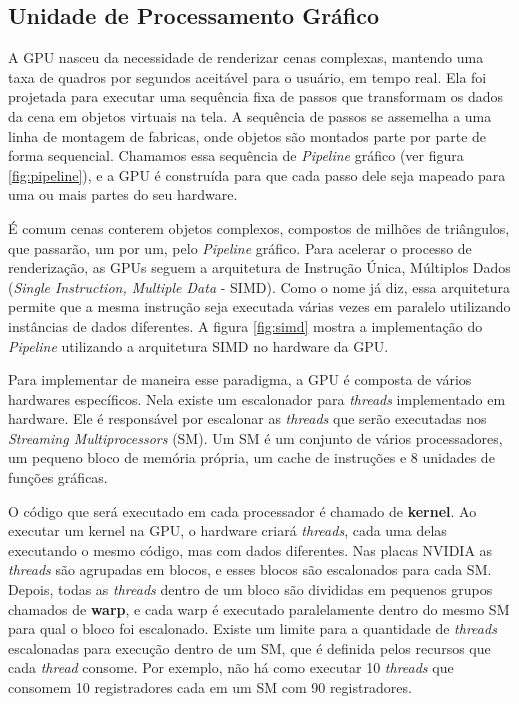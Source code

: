 \subsection{Unidade de Processamento Gráfico}
    A GPU nasceu da necessidade de renderizar cenas complexas, mantendo uma taxa de quadros por segundos
aceitável para o usuário, em tempo real. Ela foi projetada para executar uma sequência fixa de passos que transformam
os dados da cena em objetos virtuais na tela. A sequência de passos se assemelha a uma linha de montagem de fabricas,
onde objetos são montados parte por parte de forma sequencial. Chamamos essa sequência de \textit{Pipeline} gráfico 
(ver figura \ref{fig:pipeline}), e a GPU é construída para que cada passo dele seja mapeado para uma ou mais partes do 
seu hardware.

    É comum cenas conterem objetos complexos, compostos de milhões de triângulos, que passarão, um por um, pelo
\textit{Pipeline} gráfico. Para acelerar o processo de renderização, as GPUs seguem a arquitetura de Instrução Única,
Múltiplos Dados (\textit{Single Instruction, Multiple Data} - SIMD). Como o nome já diz, essa arquitetura permite que 
a mesma instrução seja executada várias vezes em paralelo utilizando instâncias de dados diferentes. A figura 
\ref{fig:simd} mostra a implementação do \textit{Pipeline} utilizando a arquitetura SIMD no hardware da GPU.
    
    Para implementar de maneira esse paradigma, a GPU é composta de vários hardwares específicos. Nela existe um 
escalonador para \textit{threads} implementado em hardware. Ele é responsável por escalonar as \textit{threads} que serão
executadas nos \textit{Streaming Multiprocessors} (SM). Um SM é um conjunto de vários processadores, um pequeno bloco de
memória própria, um cache de instruções e 8 unidades de funções gráficas.

    O código que será executado em cada processador é chamado de \textbf{kernel}. Ao executar um kernel na GPU, o 
hardware criará \textit{threads}, cada uma delas executando o mesmo código, mas com dados diferentes. Nas placas NVIDIA as \textit{threads} 
são agrupadas em blocos, e esses blocos são escalonados para cada SM. Depois, todas as \textit{threads} dentro de um bloco são 
divididas em pequenos grupos chamados de \textbf{warp}, e cada warp é executado paralelamente dentro do 
mesmo SM para qual o bloco foi escalonado. Existe um limite para a quantidade de \textit{threads} escalonadas para execução
dentro de um SM, que é definida pelos recursos que cada \textit{thread} consome. Por exemplo, não há como executar 10 \textit{threads}
que consomem 10 registradores cada em um SM com 90 registradores.

